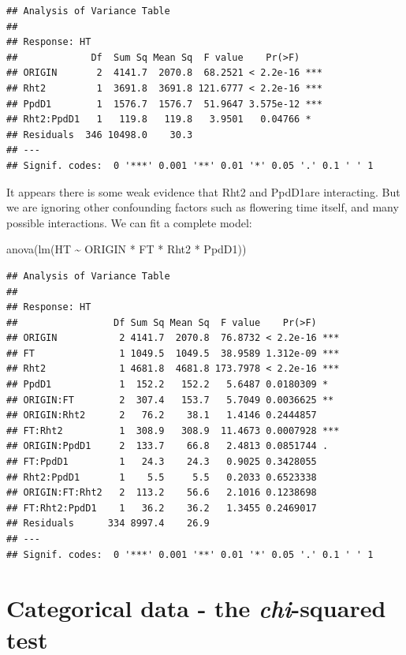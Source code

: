 \documentclass[
]{book}
\newenvironment{Shaded}{\begin{snugshade}}{\end{snugshade}}
\newcommand{\FunctionTok}[1]{\textcolor[rgb]{0.00,0.00,0.00}{#1}}
\newcommand{\NormalTok}[1]{#1}
\newcommand{\SpecialCharTok}[1]{\textcolor[rgb]{0.00,0.00,0.00}{#1}}
\begin{document}
\begin{verbatim}
## Analysis of Variance Table
## 
## Response: HT
##             Df  Sum Sq Mean Sq  F value    Pr(>F)    
## ORIGIN       2  4141.7  2070.8  68.2521 < 2.2e-16 ***
## Rht2         1  3691.8  3691.8 121.6777 < 2.2e-16 ***
## PpdD1        1  1576.7  1576.7  51.9647 3.575e-12 ***
## Rht2:PpdD1   1   119.8   119.8   3.9501   0.04766 *  
## Residuals  346 10498.0    30.3                       
## ---
## Signif. codes:  0 '***' 0.001 '**' 0.01 '*' 0.05 '.' 0.1 ' ' 1
\end{verbatim}

It appears there is some weak evidence that Rht2 and PpdD1are interacting. But we are ignoring other confounding factors such as flowering time itself, and many possible interactions. We can fit a complete model:

\begin{Shaded}
\begin{Highlighting}[]
\FunctionTok{anova}\NormalTok{(}\FunctionTok{lm}\NormalTok{(HT }\SpecialCharTok{\textasciitilde{}}\NormalTok{ ORIGIN }\SpecialCharTok{*}\NormalTok{ FT }\SpecialCharTok{*}\NormalTok{ Rht2 }\SpecialCharTok{*}\NormalTok{ PpdD1))}
\end{Highlighting}
\end{Shaded}

\begin{verbatim}
## Analysis of Variance Table
## 
## Response: HT
##                 Df Sum Sq Mean Sq  F value    Pr(>F)    
## ORIGIN           2 4141.7  2070.8  76.8732 < 2.2e-16 ***
## FT               1 1049.5  1049.5  38.9589 1.312e-09 ***
## Rht2             1 4681.8  4681.8 173.7978 < 2.2e-16 ***
## PpdD1            1  152.2   152.2   5.6487 0.0180309 *  
## ORIGIN:FT        2  307.4   153.7   5.7049 0.0036625 ** 
## ORIGIN:Rht2      2   76.2    38.1   1.4146 0.2444857    
## FT:Rht2          1  308.9   308.9  11.4673 0.0007928 ***
## ORIGIN:PpdD1     2  133.7    66.8   2.4813 0.0851744 .  
## FT:PpdD1         1   24.3    24.3   0.9025 0.3428055    
## Rht2:PpdD1       1    5.5     5.5   0.2033 0.6523338    
## ORIGIN:FT:Rht2   2  113.2    56.6   2.1016 0.1238698    
## FT:Rht2:PpdD1    1   36.2    36.2   1.3455 0.2469017    
## Residuals      334 8997.4    26.9                       
## ---
## Signif. codes:  0 '***' 0.001 '**' 0.01 '*' 0.05 '.' 0.1 ' ' 1
\end{verbatim}

\hypertarget{categorical-data---the-chi-squared-test}{%
\section{\texorpdfstring{Categorical data - the \emph{chi}-squared test}{Categorical data - the chi-squared test}}\label{categorical-data---the-chi-squared-test}}
\end{document}
